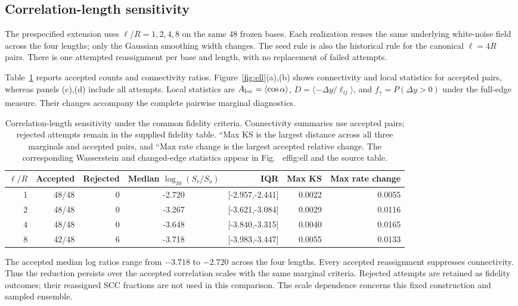 \documentclass[11pt]{article}
\begin{document}
\subsection{Correlation-length sensitivity}
The prespecified extension uses $\ell/R=1,2,4,8$ on the same 48 frozen bases. Each realization reuses the same underlying white-noise field across the four lengths; only the Gaussian smoothing width changes. The seed rule is also the historical rule for the canonical $\ell=4R$ pairs. There is one attempted reassignment per base and length, with no replacement of failed attempts.

Table~\ref{tab:ell} reports accepted counts and connectivity ratios. Figure~\ref{fig:ell}(a),(b) shows connectivity and local statistics for accepted pairs, whereas panels (c),(d) include all attempts. Local statistics are $A_{\rm loc}=\langle\cos\alpha\rangle$, $D=\langle-\Delta y/\ell_{ij}\rangle$, and $f_\uparrow=P(\Delta y>0)$ under the full-edge measure. Their changes accompany the complete pairwise marginal diagnostics.

\begin{table}[htbp]
\centering\small
\caption{Correlation-length sensitivity under the common fidelity criteria. Connectivity summaries use accepted pairs; rejected attempts remain in the supplied fidelity table. ``Max KS is the largest distance across all three marginals and accepted pairs, and ``Max rate change is the largest accepted relative change. The corresponding Wasserstein and changed-edge statistics appear in Fig.~
ef{fig:ell} and the source table.}\label{tab:ell}
\begin{tabular}{rrrcrrr}
\toprule
$\ell/R$ & Accepted & Rejected & Median $\log_{10}(S_r/S_o)$ & IQR & Max KS & Max rate change \\
\midrule
1 & 48/48 & 0 & -2.720 & [-2.957,-2.441] & 0.0022 & 0.0055 \\
2 & 48/48 & 0 & -3.267 & [-3.621,-3.084] & 0.0029 & 0.0116 \\
4 & 48/48 & 0 & -3.648 & [-3.840,-3.315] & 0.0040 & 0.0165 \\
8 & 42/48 & 6 & -3.718 & [-3.983,-3.447] & 0.0055 & 0.0133 \\
\bottomrule
\end{tabular}
\end{table}

The accepted median log ratios range from $-3.718$ to $-2.720$ across the four lengths. Every accepted reassignment suppresses connectivity. Thus the reduction persists over the accepted correlation scales with the same marginal criteria. Rejected attempts are retained as fidelity outcomes; their reassigned SCC fractions are not used in this comparison. The scale dependence concerns this fixed construction and sampled ensemble.
\end{document}
